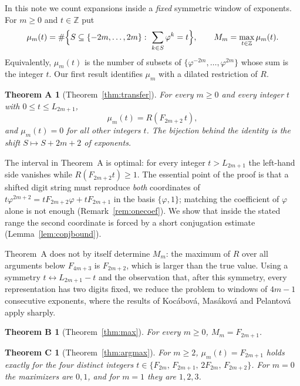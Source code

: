 \documentclass[11pt]{amsart}
\newtheorem*{theoremA}{Theorem A}
\newtheorem*{theoremB}{Theorem B}
\newtheorem*{theoremC}{Theorem C}
\theoremstyle{definition}
\theoremstyle{remark}
\numberwithin{equation}{section}
\newcommand{\Z}{\mathbb{Z}}
\begin{document}
In this note we count expansions inside a \emph{fixed} symmetric window of exponents. For
$m\ge 0$ and $t\in\Z$ put
\[
  \mu_m(t)=\#\Bigl\{S\subseteq\{-2m,\dots,2m\}:\ \sum_{k\in S}\varphi^k=t\Bigr\},
  \qquad M_m=\max_{t\in\Z}\mu_m(t).
\]
Equivalently, $\mu_m(t)$ is the number of subsets of $\{\varphi^{-2m},\dots,\varphi^{2m}\}$ whose
sum is the integer $t$. Our first result identifies $\mu_m$ with a dilated restriction of $R$.

\begin{theoremA}[Theorem~\ref{thm:transfer}]
For every $m\ge0$ and every integer $t$ with $0\le t\le L_{2m+1}$,
\[
  \mu_m(t)=R(F_{2m+2}\,t),
\]
and $\mu_m(t)=0$ for all other integers $t$. The bijection behind the identity is the shift
$S\mapsto S+2m+2$ of exponents.
\end{theoremA}

The interval in Theorem~A is optimal: for every integer $t>L_{2m+1}$ the left-hand side vanishes
while $R(F_{2m+2}t)\ge1$. The essential point of the proof is that a shifted digit string must
reproduce \emph{both} coordinates of $t\varphi^{2m+2}=tF_{2m+2}\varphi+tF_{2m+1}$ in the basis
$\{\varphi,1\}$; matching the coefficient of $\varphi$ alone is not enough
(Remark~\ref{rem:onecoef}). We show that inside the stated range the second coordinate is forced by
a short conjugation estimate (Lemma~\ref{lem:conjbound}).

Theorem~A does not by itself determine $M_m$: the maximum of $R$ over all arguments below
$F_{4m+3}$ is $F_{2m+2}$, which is larger than the true value. Using a symmetry
$t\leftrightarrow L_{2m+1}-t$ and the observation that, after this symmetry, every representation has
two digits fixed, we reduce the problem to windows of $4m-1$ consecutive exponents, where the
results of Koc\'abov\'a, Mas\'akov\'a and Pelantov\'a~\cite{KMP2005} apply sharply.

\begin{theoremB}[Theorem~\ref{thm:max}]
For every $m\ge 0$, $M_m=F_{2m+1}$.
\end{theoremB}

\begin{theoremC}[Theorem~\ref{thm:argmax}]
For $m\ge2$, $\mu_m(t)=F_{2m+1}$ holds exactly for the four distinct integers
$t\in\{F_{2m},\,F_{2m+1},\,2F_{2m},\,F_{2m+2}\}$. For $m=0$ the maximizers are $0,1$, and for $m=1$
they are $1,2,3$.
\end{theoremC}
\end{document}
